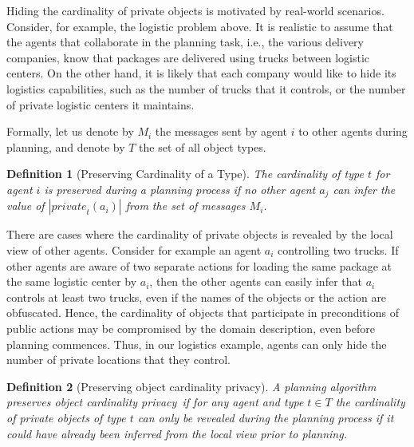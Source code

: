 \documentclass[letterpaper]{article}
\newcommand{\private}[2]{\textit{private}_{#1}(#2)}
\newtheorem{definition}{Definition}
\newcommand\cprivacy{object cardinality privacy}
\theoremstyle{definition}
\begin{document}
Hiding the cardinality of private objects is motivated by real-world scenarios. Consider, for example, the logistic problem above. It is realistic to assume that the agents that collaborate in the planning task, i.e., the various delivery companies, know that packages are delivered using trucks between logistic centers. On the other hand, it is likely that each company would like to hide its logistics capabilities, such as the number of trucks that it controls, or the number of private logistic centers it maintains.

Formally, let us denote by $M_i$ the messages sent by agent $i$ to other agents during planning, and denote by $T$ the set of all object types. 
\begin{definition}[Preserving Cardinality of a Type]
The cardinality of type $t$ for agent $i$ is preserved during a planning process if no other agent $a_j$ can infer the value of $|\private{t}{a_i}|$ from the set of messages $M_i$.
\end{definition}

There are cases where the cardinality of private objects is revealed by the local view of other agents. Consider for example an agent $a_i$ controlling two trucks. If other agents are aware of two separate actions for loading the same package at the same logistic center by $a_i$, then the other agents can easily infer that $a_i$ controls at least two trucks, even if the names of the objects or the action are obfuscated. %
Hence, the cardinality of objects that participate in preconditions of public actions may be compromised by the domain description, even before planning commences. %
Thus, in our logistics example, agents can only hide the number of private locations that they control.


\begin{definition}[Preserving \cprivacy]
A planning algorithm preserves \cprivacy\ if for any agent and type $t\in T$ the cardinality of private objects of type $t$ can only be revealed during the planning process if it could have already been inferred from the local view prior to planning. 
\label{def:cprivacy}
\end{definition}
\end{document}
